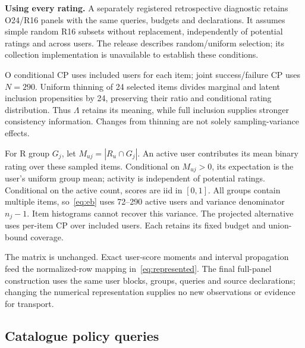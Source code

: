\documentclass[conference]{IEEEtran}
\begin{document}
\textbf{Using every rating.} A separately registered retrospective diagnostic retains O24/R16 panels with the same queries, budgets and declarations. It assumes simple random R16 subsets without replacement, independently of potential ratings and across users. The release describes random/uniform selection; its collection implementation is unavailable to establish these conditions.

O conditional CP uses included users for each item; joint success/failure CP uses $N=290$. Uniform thinning of 24 selected items divides marginal and latent inclusion propensities by 24, preserving their ratio and conditional rating distribution. Thus $\Lambda$ retains its meaning, while full inclusion supplies stronger consistency information. Changes from thinning are not solely sampling-variance effects.

For R group $G_j$, let $M_{uj}=|R_u\cap G_j|$. An active user contributes its mean binary rating over these sampled items. Conditional on $M_{uj}>0$, its expectation is the user's uniform group mean; activity is independent of potential ratings. Conditional on the active count, scores are iid in $[0,1]$. All groups contain multiple items, so~\eqref{eq:eb} uses 72--290 active users and variance denominator $n_j-1$. Item histograms cannot recover this variance. The projected alternative uses per-item CP over included users. Each retains its fixed budget and union-bound coverage.

The matrix is unchanged. Exact user-score moments and interval propagation feed the normalized-row mapping in~\eqref{eq:represented}. The final full-panel construction uses the same user blocks, groups, queries and source declarations; changing the numerical representation supplies no new observations or evidence for transport.

\begin{table}[t]
\centering
\caption{Coat primary-query lower bounds in success-probability units at $\Lambda=2$, $\rho=0$, $\alpha=.05$. Both protocols use 290 users. Full panels change the statistics and inclusion-consistency information. R full-cell control additionally assumes full-cell transport.}
\label{tab:coat-blocks}
\end{table}





\subsection{Catalogue policy queries}\label{sec:catalogue-workflow}


\end{document}
